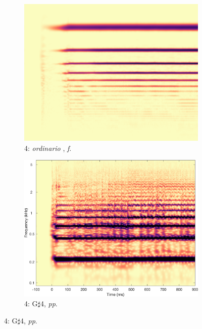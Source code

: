 \begin{figure}
        \begin{subfigure}{0.20\textwidth}
                \centering
                \includegraphics[width=\linewidth]{./figs/demo/TpC-ord_flatt-F4-f.png}
                \caption*{4: \emph{ordinario}%
                , \emph{f}.}
                \label{fig:TpC-ord_flatt-F4-f}
        \end{subfigure}%
        \begin{subfigure}{0.20\textwidth}
                \centering
                \includegraphics[width=\linewidth]{./figs/demo/TpC-flatt-Gsh4-pp.png}
                \caption*{4: G$\sharp$4, \emph{pp}.}
                \label{fig:TpC-flatt-Gsh4-pp}
        \end{subfigure}%


\end{figure}
